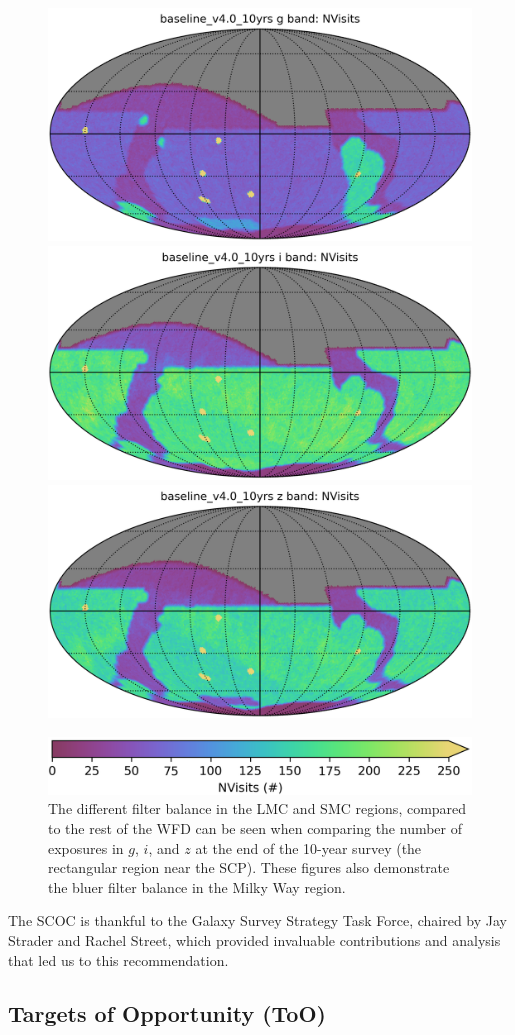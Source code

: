\begin{figure}
  \centering
  \includegraphics[width=0.32\linewidth]{figures/baseline_v4_0_10yrs_NVisits_g_band_HEAL_SkyMap.png}\includegraphics[width=0.32\linewidth]{figures/baseline_v4_0_10yrs_NVisits_i_band_HEAL_SkyMap.png}
  \includegraphics[width=0.32\linewidth]{figures/baseline_v4_0_10yrs_NVisits_z_band_HEAL_SkyMap.png}

  \includegraphics[width=0.6\linewidth]{figures/baseline_v4_0_10yrs_NVisits_colorbar.png}
    \caption{The different filter balance in the LMC and SMC regions, compared to the rest of the WFD can be seen when comparing the number of exposures in $g$, $i$, and $z$ at the end of the 10-year survey (the rectangular region near the SCP). These figures also demonstrate the bluer filter
    balance in the Milky Way region.}
    \label{fig:enter-label}
\end{figure}

The SCOC is thankful to the Galaxy Survey Strategy Task Force, chaired by Jay Strader and Rachel Street, which provided invaluable contributions and analysis that led us to this recommendation.





\FloatBarrier





\subsection{Targets of Opportunity (ToO)}\label{sec:ToO}
 
